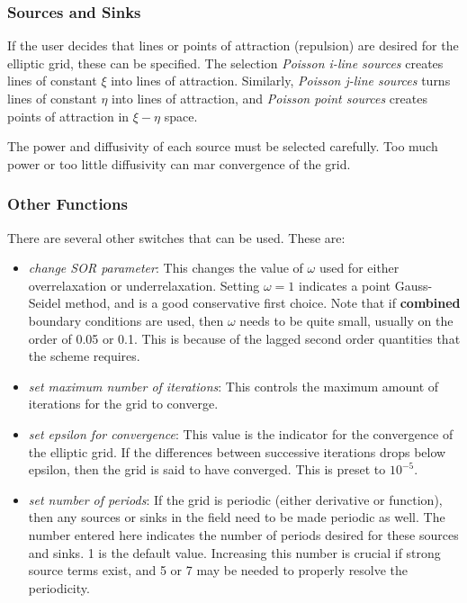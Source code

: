 \subsubsection{Sources and Sinks}

If the user decides that lines or points of attraction (repulsion) are desired for 
the elliptic grid, these can be specified.  The selection \emph{Poisson i-line sources} 
creates lines of constant $\xi$ into lines of attraction.  Similarly, \emph{Poisson
j-line sources} turns lines of constant $\eta$ into lines of attraction, and 
\emph{Poisson point sources} creates points of attraction in $\xi-\eta$ space.

The power and diffusivity of each source must be selected carefully.  Too much power or 
too little diffusivity can mar convergence of the grid.

\subsubsection{Other Functions}

There are several other switches that can be used.  These are:

\begin{itemize}
 \item \emph{change SOR parameter}:  This changes the value of $\omega$ used for either 
  overrelaxation or underrelaxation.  Setting $\omega=1$ indicates a point Gauss-
  Seidel method, and is a good conservative first choice.  Note that if {\bf combined}
  boundary conditions are used, then $\omega$ needs to be quite small, usually on
  the order of 0.05 or 0.1.  This is because of the lagged second order quantities
  that the scheme requires.
 \item \emph{set maximum number of iterations}:  This controls the maximum amount of iterations
  for the grid to converge.
 \item \emph{set epsilon for convergence}:  This value is the indicator for the convergence
  of the elliptic grid.  If the differences between successive iterations drops below
  epsilon, then the grid is said to have converged.  This 
  is preset to $10^{-5}$.
 \item \emph{set number of periods}:  If the grid is periodic (either derivative or function),
  then any sources or sinks in the field need to be made periodic as well.  The number 
  entered here indicates the number of periods desired for these sources and sinks.
  1 is the default value.  
  Increasing this number is crucial if strong source terms exist, and 5 or 7 may 
  be needed to properly resolve the periodicity.
 \end{itemize}

